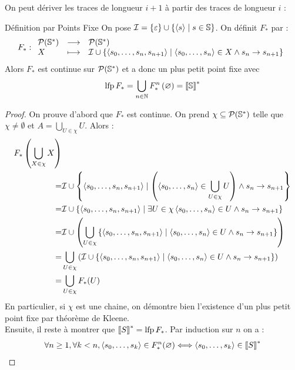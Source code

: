 \documentclass{cours}
\begin{document}
On peut dériver les traces de longueur $i + 1$ à partir des traces de longueur $i$ :
\begin{théorème}{Définition par Points Fixe}
On pose $\mathcal{I} = \{\varepsilon\} \cup \left\{\left\langle s \right\rangle \mid s \in \mathbb{S}\right\}$. On définit $F_{*}$ par :
\[
	F_{*} : \begin{array}{lcl}
		\mathcal{P}(\mathbb{S}^{*}) & \longrightarrow & \mathcal{P}(\mathbb{S}^{*})                                                                                                                \\
		X                   & \longmapsto     & \mathcal{I} \cup \left\{\left\langle s_{0}, \ldots, s_{n}, s_{n + 1} \right\rangle\mid \left\langle s_{0}, \ldots, s_{n} \right\rangle \in X \land s_{n} \to s_{n + 1}\right\}
	\end{array}
\]
Alors $F_{*}$ est continue sur $\mathcal{P}(\mathbb{S}^{*})$ et a donc un plus petit point fixe avec
\[
	\operatorname{lfp} F_{*} = \bigcup_{n \in \mathbb{N}} F_{*}^{n}\left(\varnothing\right) = \left\llbracket \mathbb{S} \right\rrbracket^{*}
\]
\end{théorème}
\begin{proof}
	On prouve d'abord que $F_{*}$ est continue. On prend $\chi \subseteq \mathcal{P}(\mathbb{S}^{*})$ telle que $\chi \neq \emptyset$ et $A = \bigcup_{U \in \chi} U$. Alors :
	\[\begin{aligned}
			F_{*}\left(\bigcup_{X \in \chi}X\right) &                                                                                                                                                                               \\
			=                                       & \mathcal{I} \cup \left\{\left\langle s_{0}, \ldots, s_{n}, s_{n + 1} \right\rangle \mid \left(\left\langle s_{0}, \ldots, s_{n} \right\rangle \in \bigcup_{U \in \chi} U\right) \land s_{n} \rightarrow s_{n + 1}\right\} \\
			=                                       & \mathcal{I} \cup \left\{\left\langle s_{0}, \ldots, s_{n}, s_{n + 1} \right\rangle \mid \exists U \in \chi \left\langle s_{0}, \ldots, s_{n} \right\rangle \in U \land s_{n} \rightarrow s_{n + 1}\right\}                \\
			=                                       & \mathcal{I} \cup \left(\bigcup_{U \in \chi} \left\{\left\langle s_{0}, \ldots, s_{n}, s_{n + 1} \right\rangle\mid \left\langle s_{0}, \ldots, s_{n} \right\rangle\in U \land s_{n} \rightarrow s_{n + 1}\right\}\right)   \\
			=                                       & \bigcup_{U \in \chi}\left(\mathcal{I} \cup \left\{\left\langle s_{0}, \ldots, s_{n}, s_{n + 1} \right\rangle \mid \left\langle s_{0}, \ldots, s_{n} \right\rangle \in U \land s_{n} \rightarrow s_{n + 1}\right\}\right)  \\
			=                                       & \bigcup_{U \in \chi} F_{*}(U)
		\end{aligned}\]
	En particulier, si $\chi$ est une chaine, on démontre bien l'existence d'un plus petit point fixe par théorème de Kleene. \\
	Ensuite, il reste à montrer que $\left\llbracket S \right\rrbracket^{*} = \operatorname{lfp} F_{*}$. Par induction sur $n$ on a :
	\[
		\forall n \geq 1, \forall k < n, \left\langle s_{0}, \ldots, s_{k} \right\rangle \in F_{*}^{n}(\varnothing) \Longleftrightarrow \left\langle s_{0}, \ldots, s_{k} \right\rangle \in \left\llbracket S \right\rrbracket^{*}
	\]
\end{proof}
\end{document}
